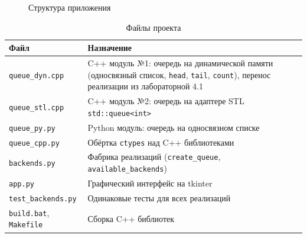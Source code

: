 \documentclass[oneside,a4paper,14pt]{extarticle} %
\begin{document}
\begin{figure}[H]\centering
\scalebox{0.72}{}
\caption{Структура приложения}
\end{figure}

\begin{table}[H]
\caption{Файлы проекта}
\centering\small\singlespacing
\begin{tabular}{|p{3.6cm}|p{11.4cm}|}\hline
\textbf{Файл} & \textbf{Назначение}\\\hline
\texttt{queue\_dyn.cpp} & C++ модуль №1: очередь на динамической памяти (односвязный список, \texttt{head}, \texttt{tail}, \texttt{count}), перенос реализации из лабораторной 4.1\\\hline
\texttt{queue\_stl.cpp} & C++ модуль №2: очередь на адаптере STL \texttt{std::queue<int>}\\\hline
\texttt{queue\_py.py} & Python модуль: очередь на односвязном списке\\\hline
\texttt{queue\_cpp.py} & Обёртка \texttt{ctypes} над C++ библиотеками\\\hline
\texttt{backends.py} & Фабрика реализаций (\texttt{create\_queue}, \texttt{available\_backends})\\\hline
\texttt{app.py} & Графический интерфейс на tkinter\\\hline
\texttt{test\_backends.py} & Одинаковые тесты для всех реализаций\\\hline
\texttt{build.bat}, \texttt{Makefile} & Сборка C++ библиотек\\\hline
\end{tabular}
\end{table}
\end{document}
